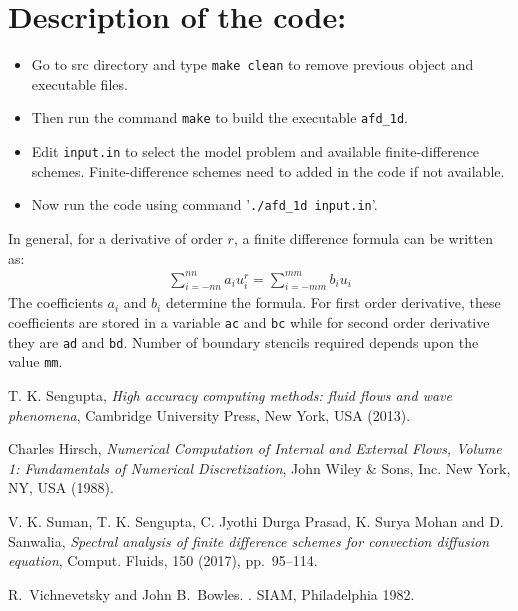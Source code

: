 \documentclass[fleqn]{article}
\begin{document}
\section{Description of the code:}
\begin{itemize}
\item Go to src directory and type {\tt make clean} to remove previous object and executable files.
\item Then run the command {\tt make} to build the executable {\tt afd\_1d}.
\item Edit {\tt input.in} to select the model problem and available finite-difference schemes. Finite-difference schemes need to added in the code if not available.
\item Now run the code using command '{\tt ./afd\_1d input.in}'.
\end{itemize}

In general, for a derivative of order $r$, a finite difference formula  can be written as:
\begin{align*}
\sum_{i=-nn}^{nn} a_{i} u_i^{r} = \sum_{i=-mm}^{mm} b_{i} u_i
\end{align*}
The coefficients $a_i$ and $b_i$ determine the formula. For first order derivative, these coefficients are stored in a variable {\tt ac} and {\tt bc} while for second order derivative they are {\tt ad} and {\tt bd}. Number of boundary stencils required depends upon the value {\tt mm}.



\begin{thebibliography}{1}

        {\sc T. K. Sengupta}, {\em High accuracy computing methods: fluid flows and wave phenomena}, Cambridge University Press, New York, USA (2013).

        {\sc Charles Hirsch}, {\em Numerical Computation of Internal and External Flows, Volume 1: Fundamentals of Numerical Discretization}, John Wiley \& Sons, Inc. New York, NY, USA (1988).

        {\sc V. K. Suman, T. K. Sengupta, C. Jyothi Durga Prasad, K. Surya Mohan and D. Sanwalia}, {\em Spectral analysis of finite difference schemes for convection diffusion equation}, Comput. Fluids, 150 (2017), pp.~95--114.     
        
R.~Vichnevetsky and John B.~Bowles.
.
\newblock SIAM, Philadelphia 1982.

        
\end{thebibliography}
\end{document}
